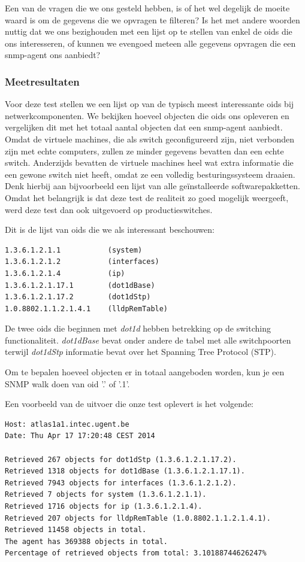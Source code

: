 Een van de vragen die we ons gesteld hebben, is of het wel degelijk de moeite waard is om de gegevens die we opvragen te filteren?
Is het met andere woorden nuttig dat we ons bezighouden met een lijst op te stellen van enkel de \glspl{oid} die ons interesseren,
of kunnen we evengoed meteen alle gegevens opvragen die een \gls{snmp-agent} ons aanbiedt?

\subsubsection{Meetresultaten}

Voor deze test stellen we een lijst op van de typisch meest interessante \glspl{oid} bij netwerkcomponenten.
We bekijken hoeveel objecten die \glspl{oid} ons opleveren en vergelijken dit met het totaal aantal objecten dat een \gls{snmp-agent} aanbiedt.
Omdat de virtuele machines, die als switch geconfigureerd zijn, niet verbonden zijn met echte computers, zullen ze minder gegevens bevatten dan een echte switch.
Anderzijds bevatten de virtuele machines heel wat extra informatie die een gewone switch niet heeft, omdat ze een volledig besturingssysteem draaien.
Denk hierbij aan bijvoorbeeld een lijst van alle geïnstalleerde softwarepakketten.
Omdat het belangrijk is dat deze test de realiteit zo goed mogelijk weergeeft, werd deze test dan ook uitgevoerd op productieswitches.

Dit is de lijst van \glspl{oid} die we als interessant beschouwen:

\begin{lstlisting}
1.3.6.1.2.1.1			(system)
1.3.6.1.2.1.2			(interfaces)
1.3.6.1.2.1.4			(ip)
1.3.6.1.2.1.17.1 		(dot1dBase)
1.3.6.1.2.1.17.2		(dot1dStp)
1.0.8802.1.1.2.1.4.1	(lldpRemTable)
\end{lstlisting}

De twee \glspl{oid} die beginnen met \textit{dot1d} hebben betrekking op de switching functionaliteit.
\textit{dot1dBase} bevat onder andere de tabel met alle switchpoorten terwijl \textit{dot1dStp} informatie bevat over het Spanning Tree Protocol (STP).

Om te bepalen hoeveel objecten er in totaal aangeboden worden, kun je een SNMP walk doen van \gls{oid} '.' of '.1'.

Een voorbeeld van de uitvoer die onze test oplevert is het volgende:

\begin{lstlisting}
Host: atlas1a1.intec.ugent.be
Date: Thu Apr 17 17:20:48 CEST 2014

Retrieved 267 objects for dot1dStp (1.3.6.1.2.1.17.2).
Retrieved 1318 objects for dot1dBase (1.3.6.1.2.1.17.1).
Retrieved 7943 objects for interfaces (1.3.6.1.2.1.2).
Retrieved 7 objects for system (1.3.6.1.2.1.1).
Retrieved 1716 objects for ip (1.3.6.1.2.1.4).
Retrieved 207 objects for lldpRemTable (1.0.8802.1.1.2.1.4.1).
Retrieved 11458 objects in total.
The agent has 369388 objects in total.
Percentage of retrieved objects from total: 3.10188744626247%
\end{lstlisting}

